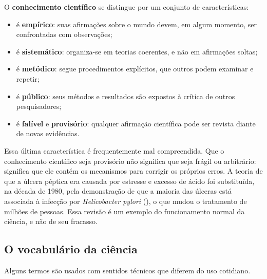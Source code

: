 \documentclass[
]{book}
\providecommand{\tightlist}{%
  \setlength{\itemsep}{0pt}\setlength{\parskip}{0pt}}
\begin{document}
O \textbf{conhecimento científico} se distingue por um conjunto de características:

\begin{itemize}
\tightlist
\item
  é \textbf{empírico}: suas afirmações sobre o mundo devem, em algum momento, ser confrontadas com observações;
\item
  é \textbf{sistemático}: organiza-se em teorias coerentes, e não em afirmações soltas;
\item
  é \textbf{metódico}: segue procedimentos explícitos, que outros podem examinar e repetir;
\item
  é \textbf{público}: seus métodos e resultados são expostos à crítica de outros pesquisadores;
\item
  é \textbf{falível} e \textbf{provisório}: qualquer afirmação científica pode ser revista diante de novas evidências.
\end{itemize}

Essa última característica é frequentemente mal compreendida. Que o conhecimento científico seja provisório não significa que seja frágil ou arbitrário: significa que ele contém os mecanismos para corrigir os próprios erros. A teoria de que a úlcera péptica era causada por estresse e excesso de ácido foi substituída, na década de 1980, pela demonstração de que a maioria das úlceras está associada à infecção por \emph{Helicobacter pylori} (), o que mudou o tratamento de milhões de pessoas. Essa revisão é um exemplo do funcionamento normal da ciência, e não de seu fracasso.

\subsection{O vocabulário da ciência}\label{o-vocabuluxe1rio-da-ciuxeancia}

Alguns termos são usados com sentidos técnicos que diferem do uso cotidiano.
\end{document}

